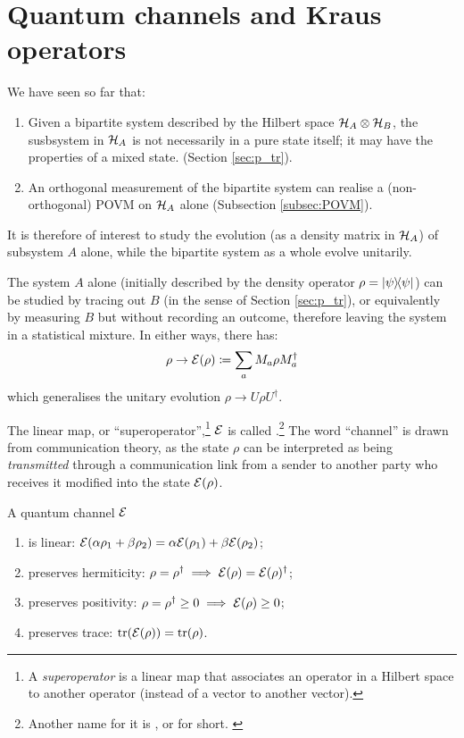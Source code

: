 \section{Quantum channels and Kraus operators}

We have seen so far that:
\begin{enumerate}
\item
  Given a bipartite system
  described by the Hilbert space
  $\mathcal{H}_A\otimes\mathcal{H}_B$,
  the susbsystem in $\mathcal{H}_A$
  is not necessarily in a pure state itself; it
  may have the properties of a mixed state.
  (Section \ref{sec:p_tr}).
\item
  An orthogonal measurement of the bipartite system can realise a
  (non-orthogonal) POVM on $\mathcal{H}_A$ alone (Subsection \ref{subsec:POVM}).
\end{enumerate}

It is therefore of interest to study
the evolution (as a density matrix in $\mathcal{H}_A$) of subsystem $A$ alone,
while the bipartite system as a whole evolve unitarily.

The system $A$ alone
(initially described by the density operator $\rho=\ketbra{\psi}$)
can be studied by tracing out $B$
(in the sense of Section \ref{sec:p_tr}),
or equivalently by measuring $B$
but without recording an outcome, therefore leaving the system
in a statistical mixture.
In either ways, there has:
\begin{equation}\label{eq:channel}
  \rho \rightarrow \mathcal{E}(\rho) \coloneqq \sum_a M_a \rho M_a^{\dagger}
\end{equation}
which generalises the unitary evolution $\rho \rightarrow U \rho U^{\dagger}$.

The linear map, or ``superoperator'',\footnote{
  A \emph{superoperator} is a linear map that associates an operator
  in a Hilbert space to another operator (instead of a vector to another vector).
}
$\mathcal{E}$
is called .\footnote{
  Another name for it is
  ,
  or  for short. \parencite[sec.3.2]{PreskillNotes}
}
The word ``channel'' is drawn from communication theory,
as the state $\rho$ can be interpreted as being \emph{transmitted}
through
a communication link from a sender to another party
who receives it modified into the state $\mathcal{E}(\rho)$.

A quantum channel $\mathcal{E}$
\begin{enumerate}
  \item is linear:
    $\mathcal{E}(\alpha\rho_1+\beta\rho_2) = \alpha\mathcal{E}(\rho_1) + \beta\mathcal{E}(\rho_2)$;
  \item preserves hermiticity:
    $\rho = \rho^{\dagger} \implies \mathcal{E}(\rho) = \mathcal{E}(\rho)^{\dagger}$;
  \item preserves positivity:
    $\rho = \rho^{\dagger} \geq 0 \implies \mathcal{E}(\rho) \geq 0$;
  \item preserves trace:
    $\tr(\mathcal{E}(\rho)) = \tr(\rho)$.  
\end{enumerate}

